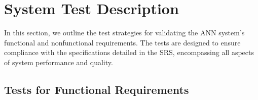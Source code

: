 \documentclass[12pt, titlepage]{article}
\begin{document}







\section{System Test Description}\label{SystemTest}

In this section, we outline the test strategies for validating the ANN system's functional 
and nonfunctional requirements. The tests are designed to ensure compliance with the 
specifications detailed in the SRS, encompassing all aspects of system performance and quality.
	
\subsection{Tests for Functional Requirements} \label{T1T2}
\end{document}
